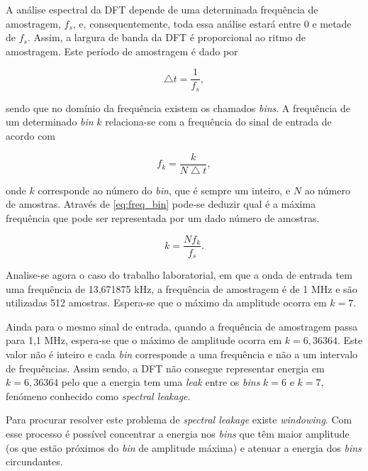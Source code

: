 \documentclass[11pt]{article}
\numberwithin{equation}{section}
\begin{document}
A análise espectral da DFT depende de uma determinada frequência de amostragem, $f_{s}$, e, consequentemente, toda essa análise estará entre $0$ e metade de $f_{s}$. Assim, a largura de banda da DFT é proporcional ao ritmo de amostragem. Este período de amostragem é dado por

\vspace{-3mm}
\begin{equation}
\bigtriangleup t = \frac{1}{f_{s}},
\end{equation}

\vspace{1mm}
sendo que no domínio da frequência existem os chamados \textit{bins}. A frequência de um determinado \textit{bin} $k$ relaciona-se com a frequência do sinal de entrada de acordo com

\vspace{-3mm}
\begin{equation}
f_{k} = \frac{k}{N \bigtriangleup t},
\label{eq:freq_bin}
\end{equation}

\vspace{1mm}
onde $k$ corresponde ao número do \textit{bin}, que é sempre um inteiro, e $N$ ao número de amostras. Através de \ref{eq:freq_bin} pode-se deduzir qual é a máxima frequência que pode ser representada por um dado número de amostras.

\vspace{-3mm}
\begin{equation}
k = \frac{N f_{k}}{f_{s}}.
\label{eq:max_bin}
\end{equation}

\vspace{1mm}
Analise-se agora o caso do trabalho laboratorial, em que a onda de entrada tem uma frequência de 13,671875 kHz, a frequência de amostragem é de 1 MHz e são utilizadas 512 amostras. Espera-se que o máximo da amplitude ocorra em $k = 7$.

Ainda para o mesmo sinal de entrada, quando a frequência de amostragem passa para 1,1 MHz, espera-se que o máximo de amplitude ocorra em $k = 6,36364$. Este valor não é inteiro  e cada \textit{bin} corresponde a uma frequência e não a um intervalo de frequências. Assim sendo, a DFT não consegue representar energia em $k = 6,36364$ pelo que a energia tem uma \textit{leak} entre os \textit{bins} $k = 6$ e $k = 7$, fenómeno conhecido como \textit{spectral leakage}.

Para procurar resolver este problema de \textit{spectral leakage} existe \textit{windowing}. Com esse processo é possível concentrar a energia nos \textit{bins} que têm maior amplitude (os que estão próximos do \textit{bin} de amplitude máxima) e atenuar a energia dos \textit{bins} circundantes.
\end{document}

